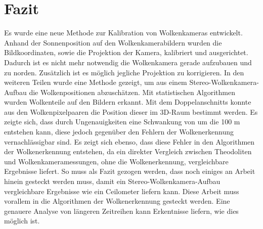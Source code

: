 \documentclass[a4paper,11pt,twoside,german]{article}
\newcommand{\absatz}{\smallbreak}
\newcommand{\literaturverzeichnis}[1]{
    \renewcommand{\harvardand}{und} %
    
    }
\begin{document}
\section{Fazit}
Es wurde eine neue Methode zur Kalibration von Wolkenkameras entwickelt. Anhand der Sonnenposition auf den Wolkenkamerabildern wurden die Bildkoordinaten, sowie die Projektion der Kamera, kalibriert und ausgerichtet. Dadurch ist es nicht mehr notwendig die Wolkenkamera gerade aufzubauen und zu norden. Zusätzlich ist es möglich jegliche Projektion zu korrigieren. In den weiteren Teilen wurde eine Methode gezeigt, um aus einem Stereo-Wolkenkamera-Aufbau die Wolkenpositionen abzuschätzen. Mit statistischen Algorithmen wurden Wolkenteile auf den Bildern erkannt. Mit dem Doppelanschnitts konnte aus den Wolkenpixelpaaren die Position dieser im 3D-Raum bestimmt werden. Es zeigte sich, dass durch Ungenauigkeiten eine Schwankung von um die 100 m entstehen kann, diese jedoch gegenüber den Fehlern der Wolkenerkennung vernachlässigbar sind. Es zeigt sich ebenso, dass diese Fehler in den Algorithmen der Wolkenerkennung entstehen, da ein direkter Vergleich zwischen Theodoliten und Wolkenkameramessungen, ohne die Wolkenerkennung, vergleichbare Ergebnisse liefert.\absatz
So muss als Fazit gezogen werden, dass noch einiges an Arbeit hinein gesteckt werden muss, damit ein Stereo-Wolkenkamera-Aufbau vergleichbare Ergebnisse wie ein Ceilometer liefern kann. Diese Arbeit muss vorallem in die Algorithmen der Wolkenerkennung gesteckt werden. Eine genauere Analyse von längeren Zeitreihen kann Erkentnisse liefern, wie dies möglich ist.



\literaturverzeichnis{bibliography} %
\end{document}
